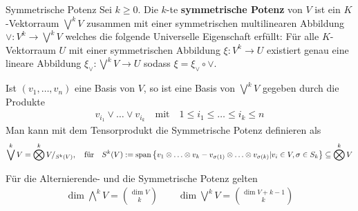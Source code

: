 \begin{definition}{Symmetrische Potenz}
    Sei $k \geq 0$. Die $k$-te \textbf{symmetrische Potenz} von $V$ ist ein $K$-Vektorraum $\bigvee^kV$ zusammen mit einer symmetrischen multilinearen Abbildung $\vee: V^k \to \bigvee^kV$ welches die folgende Universelle Eigenschaft erfüllt:
    Für alle $K$-Vektorraum $U$ mit einer symmetrischen Abbildung $\xi: V^k \to U$ existiert genau eine lineare Abbildung $\xi_{\vee}: \bigvee^kV \to U$ sodass $\xi = \xi_{\vee} \circ \vee$.

    Ist $(v_{1}, \ldots, v_{n})$ eine Basis von $V$, so ist eine Basis von $\bigvee^kV$ gegeben durch die Produkte
    \begin{align*}
        v_{i_1} \vee \ldots \vee v_{i_k} \quad \text{mit} \quad 1 \leq i_{1} \leq \ldots \leq i_k \leq n
    \end{align*}
    Man kann mit dem Tensorprodukt die Symmetrische Potenz definieren als
    \begin{align*}
        \bigvee^k V = \bigotimes^k V/_{S^k(V)}, \quad \text{für} \quad 
        S^k(V) := \operatorname{span} \left \{v_1 \otimes \ldots \otimes v_k - v_{\sigma(1)} \otimes \ldots \otimes v_{\sigma(k)}| v_i \in V, \sigma \in S_k\right\} \subseteq \bigotimes^k V
    \end{align*}
\end{definition}

Für die Alternierende- und die Symmetrische Potenz gelten
\begin{align*}
    \dim \bigwedge^k V = \binom{\dim V}{k} \qquad \dim \bigvee^k V = \binom{\dim V+k-1}{k}
\end{align*}

